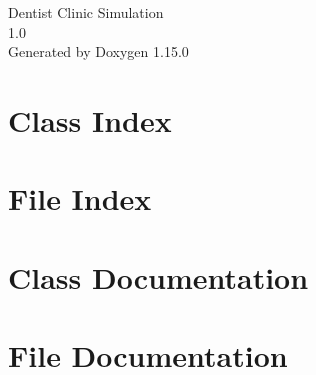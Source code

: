 \documentclass[twoside]{book}
\newcommand{\+}{\discretionary{\mbox{\scriptsize$\hookleftarrow$}}{}{}}
\newcommand{\clearemptydoublepage}{%
    \newpage{\pagestyle{empty}\cleardoublepage}%
  }
\begin{document}
  \raggedbottom
    \hypersetup{pageanchor=false,
                bookmarksnumbered=true,
                pdfencoding=unicode
               }
  \begin{titlepage}
  \vspace*{7cm}
  \begin{center}%
  {\Large Dentist Clinic Simulation}\\
  [1ex]\large 1.\+0 \\
  \vspace*{1cm}
  {\large Generated by Doxygen 1.15.0}\\
  \end{center}
  \end{titlepage}
  \clearemptydoublepage
  \tableofcontents
  \clearemptydoublepage
  \hypersetup{pageanchor=true}
\chapter{Class Index}

\chapter{File Index}

\chapter{Class Documentation}

\chapter{File Documentation}


  \backmatter
  \newpage
  \clearemptydoublepage
  \printindex
\end{document}
